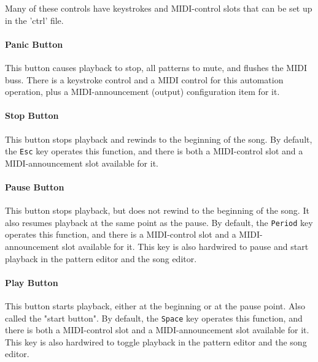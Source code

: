 \documentclass[
 11pt,
 twoside,
 a4paper,
 final                                 %
]{article}
\begin{document}
   Many of these controls have keystrokes and MIDI-control slots that can be
   set up in the 'ctrl' file.

\paragraph{Panic Button}
\label{paragraph:introduction_panic_button}

   This button causes playback to stop, all patterns to mute, and flushes the
   MIDI buss.
   There is a keystroke control and a MIDI control
   for this automation operation, plus
   a MIDI-announcement (output) configuration item for it.

\paragraph{Stop Button}
\label{paragraph:introduction_stop_button}

   This button stops playback and rewinds to the beginning of the song.
   By default, the \texttt{Esc} key operates this function,
   and there is both a MIDI-control slot and a MIDI-announcement slot
   available for it.

\paragraph{Pause Button}
\label{paragraph:introduction_pause_button}

   This button stops playback, but does not rewind to the beginning of the song.
   It also resumes playback at the same point as the pause.
   By default, the \texttt{Period} key operates this function,
   and there is a MIDI-control slot and a MIDI-announcement slot available for it.
   This key is also hardwired to pause and start playback in the pattern editor and
   the song editor.

\paragraph{Play Button}
\label{paragraph:introduction_play_button}

   This button starts playback, either at the beginning or at the pause point.
   Also called the "start button".
   By default, the \texttt{Space} key operates this function,
   and there is both a MIDI-control slot and a MIDI-announcement slot
   available for it.
   This key is also hardwired to toggle playback in the pattern editor and the
   song editor.
\end{document}
